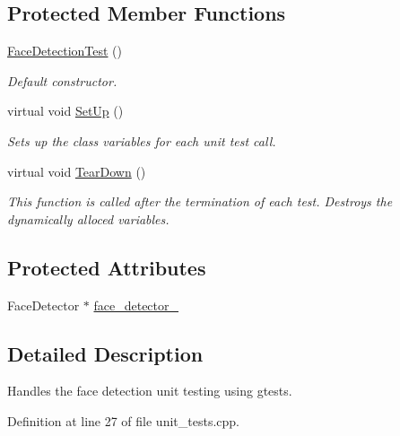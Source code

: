 \subsection*{Protected Member Functions}
\begin{DoxyCompactItemize}
\item 
\hyperlink{classFaceDetectionTest_a5d772e47e60b0f5bd04b541c9ddb19f2}{Face\-Detection\-Test} ()
\begin{DoxyCompactList}\small\item\em Default constructor. \end{DoxyCompactList}\item 
virtual void \hyperlink{classFaceDetectionTest_a112f1e86a2c7296d26eb4fea9cae6e29}{Set\-Up} ()
\begin{DoxyCompactList}\small\item\em Sets up the class variables for each unit test call. \end{DoxyCompactList}\item 
virtual void \hyperlink{classFaceDetectionTest_ac2b70fd8126f26aa1e9b4f0a8a0b7029}{Tear\-Down} ()
\begin{DoxyCompactList}\small\item\em This function is called after the termination of each test. Destroys the dynamically alloced variables. \end{DoxyCompactList}\end{DoxyCompactItemize}
\subsection*{Protected Attributes}
\begin{DoxyCompactItemize}
\item 
Face\-Detector $\ast$ \hyperlink{classFaceDetectionTest_a4bc63bdc4212643f3375fcd9a0c25a11}{face\-\_\-detector\-\_\-}
\end{DoxyCompactItemize}


\subsection{Detailed Description}
Handles the face detection unit testing using gtests. 

Definition at line 27 of file unit\-\_\-tests.\-cpp.



